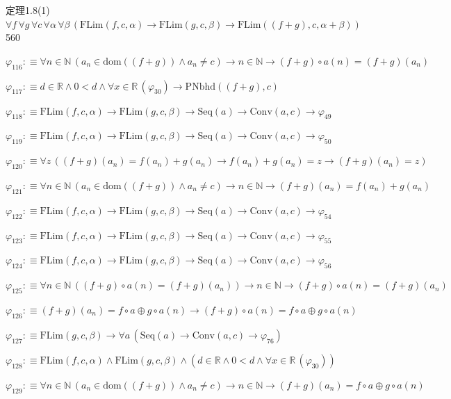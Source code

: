 \begin{fullproof}{定理1.8(1)}{$\forall f\,\forall g\,\forall c\,\forall \alpha\,\forall \beta\,(\mathrm{FLim}(f,c,\alpha) \to \mathrm{FLim}(g,c,\beta) \to \mathrm{FLim}((f + g),c,\alpha + \beta))$}{560}
\begin{abbrevlist}
\item $\varphi_{116} :\equiv \forall n \in \mathbb{N}\,(a_{n} \in \mathrm{dom}((f + g)) \land a_{n} \neq c) \to n \in \mathbb{N} \to (f + g) \circ a(n) = (f + g)(a_{n})$
\item $\varphi_{117} :\equiv d \in \mathbb{R} \land 0 < d \land \forall x \in \mathbb{R}\,(\varphi_{30}) \to \mathrm{PNbhd}((f + g),c)$
\item $\varphi_{118} :\equiv \mathrm{FLim}(f,c,\alpha) \to \mathrm{FLim}(g,c,\beta) \to \mathrm{Seq}(a) \to \mathrm{Conv}(a,c) \to \varphi_{49}$
\item $\varphi_{119} :\equiv \mathrm{FLim}(f,c,\alpha) \to \mathrm{FLim}(g,c,\beta) \to \mathrm{Seq}(a) \to \mathrm{Conv}(a,c) \to \varphi_{50}$
\item $\varphi_{120} :\equiv \forall z\,((f + g)(a_{n}) = f(a_{n}) + g(a_{n}) \to f(a_{n}) + g(a_{n}) = z \to (f + g)(a_{n}) = z)$
\item $\varphi_{121} :\equiv \forall n \in \mathbb{N}\,(a_{n} \in \mathrm{dom}((f + g)) \land a_{n} \neq c) \to n \in \mathbb{N} \to (f + g)(a_{n}) = f(a_{n}) + g(a_{n})$
\item $\varphi_{122} :\equiv \mathrm{FLim}(f,c,\alpha) \to \mathrm{FLim}(g,c,\beta) \to \mathrm{Seq}(a) \to \mathrm{Conv}(a,c) \to \varphi_{54}$
\item $\varphi_{123} :\equiv \mathrm{FLim}(f,c,\alpha) \to \mathrm{FLim}(g,c,\beta) \to \mathrm{Seq}(a) \to \mathrm{Conv}(a,c) \to \varphi_{55}$
\item $\varphi_{124} :\equiv \mathrm{FLim}(f,c,\alpha) \to \mathrm{FLim}(g,c,\beta) \to \mathrm{Seq}(a) \to \mathrm{Conv}(a,c) \to \varphi_{56}$
\item $\varphi_{125} :\equiv \forall n \in \mathbb{N}\,((f + g) \circ a(n) = (f + g)(a_{n})) \to n \in \mathbb{N} \to (f + g) \circ a(n) = (f + g)(a_{n})$
\item $\varphi_{126} :\equiv (f + g)(a_{n}) = f \circ a \oplus g \circ a(n) \to (f + g) \circ a(n) = f \circ a \oplus g \circ a(n)$
\item $\varphi_{127} :\equiv \mathrm{FLim}(g,c,\beta) \to \forall a\,(\mathrm{Seq}(a) \to \mathrm{Conv}(a,c) \to \varphi_{76})$
\item $\varphi_{128} :\equiv \mathrm{FLim}(f,c,\alpha) \land \mathrm{FLim}(g,c,\beta) \land (d \in \mathbb{R} \land 0 < d \land \forall x \in \mathbb{R}\,(\varphi_{30}))$
\item $\varphi_{129} :\equiv \forall n \in \mathbb{N}\,(a_{n} \in \mathrm{dom}((f + g)) \land a_{n} \neq c) \to n \in \mathbb{N} \to (f + g)(a_{n}) = f \circ a \oplus g \circ a(n)$

\end{abbrevlist}
\end{fullproof}
